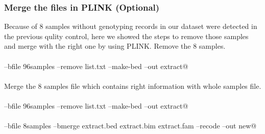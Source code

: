 \documentclass{article}\usepackage[]{graphicx}\usepackage[]{color}
\begin{document}
\subsubsection{Merge the files in PLINK (Optional)}
Because of 8 samples without genotyping records in our dataset were detected in the previous qulity control, here we showed the steps to remove those samples and merge with the right one by using PLINK. Remove the 8 samples.
\\\\\verb@plink --bfile 96samples --remove list.txt --make-bed --out extract@\\\\
Merge the 8 samples file which contains right information with whole samples file.
\\\\\verb@plink --bfile 96samples --remove list.txt --make-bed --out extract@
\\\\\verb@plink --bfile 8samples --bmerge extract.bed extract.bim extract.fam --recode --out new@
\end{document}
